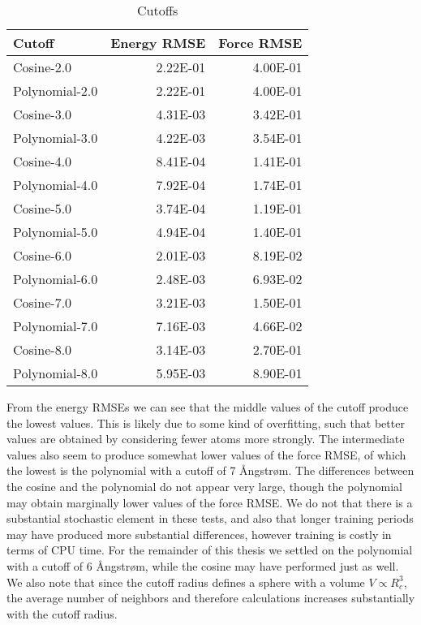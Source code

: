 \begin{table}[H]
\begin{tabular}{lrr}
\toprule
         Cutoff &  Energy RMSE &  Force RMSE \\
\midrule
     Cosine-2.0 &     2.22E-01 &    4.00E-01 \\
 Polynomial-2.0 &     2.22E-01 &    4.00E-01 \\
     Cosine-3.0 &     4.31E-03 &    3.42E-01 \\
 Polynomial-3.0 &     4.22E-03 &    3.54E-01 \\
     Cosine-4.0 &     8.41E-04 &    1.41E-01 \\
 Polynomial-4.0 &     7.92E-04 &    1.74E-01 \\
     Cosine-5.0 &     3.74E-04 &    1.19E-01 \\
 Polynomial-5.0 &     4.94E-04 &    1.40E-01 \\
     Cosine-6.0 &     2.01E-03 &    8.19E-02 \\
 Polynomial-6.0 &     2.48E-03 &    6.93E-02 \\
     Cosine-7.0 &     3.21E-03 &    1.50E-01 \\
 Polynomial-7.0 &     7.16E-03 &    4.66E-02 \\
     Cosine-8.0 &     3.14E-03 &    2.70E-01 \\
 Polynomial-8.0 &     5.95E-03 &    8.90E-01 \\
\bottomrule
\end{tabular}
\caption{Cutoffs}
\label{table:cutoffs}
\end{table}

From the energy RMSEs we can see that the middle values of the
cutoff produce the lowest values. This is likely due to some kind
of overfitting, such that better values are obtained by considering
fewer atoms more strongly. The intermediate values also
seem to produce somewhat lower values of the force RMSE,
of which the lowest is the polynomial with a cutoff of 7 Ångstrøm.
The differences between the cosine and the polynomial do not
appear very large, though the polynomial may obtain marginally
lower values of the force RMSE. We do not that there is a substantial
stochastic element in these tests, and also that longer training
periods may have produced more substantial differences, however
training is costly in terms of CPU time. For the remainder
of this thesis we settled on the polynomial with a cutoff of 6 Ångstrøm,
while the cosine may have performed just as well.
We also note that since the cutoff radius defines a sphere
with a volume $V \propto R_c^3$, the average number of neighbors and therefore
calculations increases substantially with the cutoff radius.


